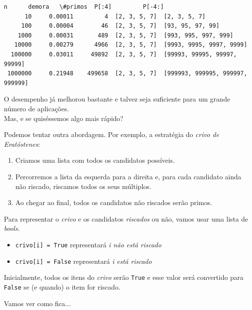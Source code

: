 \documentclass[11pt,a4paper]{article}
\providecommand{\tightlist}{%
      \setlength{\itemsep}{0pt}\setlength{\parskip}{0pt}}
\begin{document}
    \begin{Verbatim}[commandchars=\\\{\}]
       n      demora   \#primos  P[:4]         P[-4:]
      10     0.00011         4  [2, 3, 5, 7]  [2, 3, 5, 7]
     100     0.00004        46  [2, 3, 5, 7]  [93, 95, 97, 99]
    1000     0.00031       489  [2, 3, 5, 7]  [993, 995, 997, 999]
   10000     0.00279      4966  [2, 3, 5, 7]  [9993, 9995, 9997, 9999]
  100000     0.03011     49892  [2, 3, 5, 7]  [99993, 99995, 99997, 99999]
 1000000     0.21948    499658  [2, 3, 5, 7]  [999993, 999995, 999997, 999999]

    \end{Verbatim}

    O desempenho já melhorou bastante e talvez seja suficiente para um
grande número de aplicações.\\
Mas, e se quiséssemos algo mais rápido?

    Podemos tentar outra abordagem. Por exemplo, a estratégia do \emph{crivo
de Eratóstenes}:

\begin{enumerate}
\def\labelenumi{\arabic{enumi}.}
\tightlist
\item
  Criamos uma lista com todos os candidatos possíveis.
\item
  Percorremos a lista da esquerda para a direita e, para cada candidato
  ainda não riscado, riscamos todos os seus múltiplos.
\item
  Ao chegar ao final, todos os candidatos não riscados serão primos.
\end{enumerate}

    Para representar o \emph{crivo} e os candidatos \emph{riscados} ou não,
vamos usar uma lista de \emph{bools}.

\begin{itemize}
\tightlist
\item
  \texttt{crivo{[}i{]}\ =\ True} representará \emph{i não está riscado}
\item
  \texttt{crivo{[}i{]}\ =\ False} representará \emph{i está riscado}
\end{itemize}

Inicialmente, todos os itens do \emph{crivo} serão \texttt{True} e esse
valor será convertido para \texttt{False} se (e quando) o item for
riscado.

Vamos ver como fica...
\end{document}

